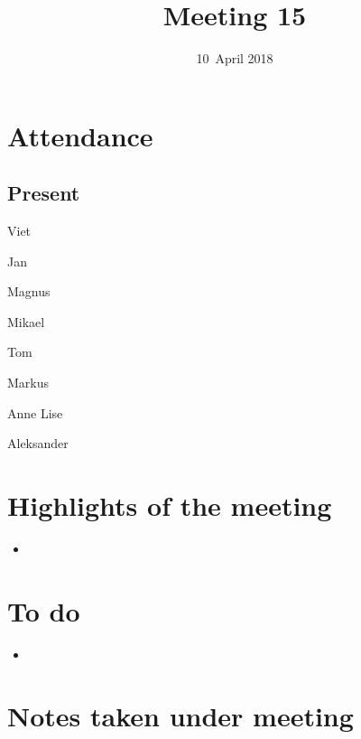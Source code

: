 \documentclass[letterpaper,11pt]{article}
\title{Meeting 15}
\date{10~April 2018}
\begin{document}
\maketitle
\section*{Attendance}
\subsection*{Present}
\begin{list}{}{}
	\item Viet
	\item Jan
	\item Magnus
	\item Mikael
	\item Tom
	\item Markus
	\item Anne Lise
	\item Aleksander
\end{list}

\newpage
\section*{Highlights of the meeting}
\begin{itemize}
	\item
\end{itemize}

\section*{To do}
\begin{itemize}
	\item
\end{itemize}

\section*{Notes taken under meeting}
\end{document}
